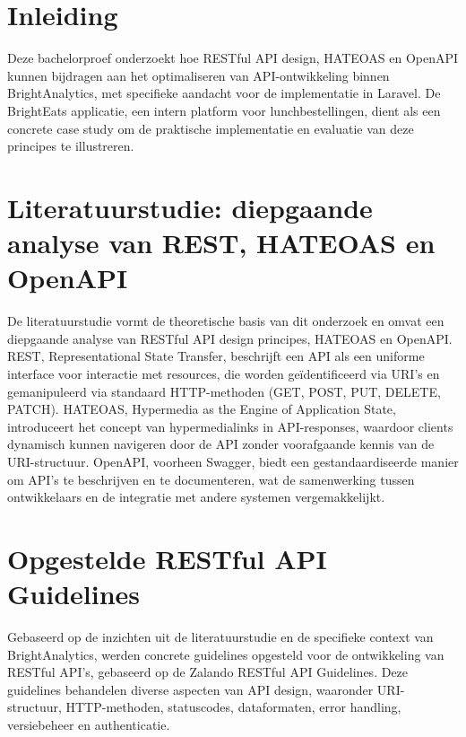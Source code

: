 \documentclass[a0,portrait]{hogent-poster}
\begin{document}
\begin{multicols}{2} %

\section{Inleiding}

Deze bachelorproef onderzoekt hoe RESTful API design, HATEOAS en OpenAPI kunnen bijdragen aan het optimaliseren van API-ontwikkeling binnen BrightAnalytics, met specifieke aandacht voor de implementatie in Laravel. De BrightEats applicatie, een intern platform voor lunchbestellingen, dient als een concrete case study om de praktische implementatie en evaluatie van deze principes te illustreren.

\section{Literatuurstudie: diepgaande analyse van REST, HATEOAS en OpenAPI}

De literatuurstudie vormt de theoretische basis van dit onderzoek en omvat een diepgaande analyse van RESTful API design principes, HATEOAS en OpenAPI. REST, Representational State Transfer, beschrijft een API als een uniforme interface voor interactie met resources, die worden geïdentificeerd via URI's en gemanipuleerd via standaard HTTP-methoden (GET, POST, PUT, DELETE, PATCH). HATEOAS, Hypermedia as the Engine of Application State, introduceert het concept van hypermedialinks in API-responses, waardoor clients dynamisch kunnen navigeren door de API zonder voorafgaande kennis van de URI-structuur. OpenAPI, voorheen Swagger, biedt een gestandaardiseerde manier om API's te beschrijven en te documenteren, wat de samenwerking tussen ontwikkelaars en de integratie met andere systemen vergemakkelijkt.

\section{Opgestelde RESTful API Guidelines}

Gebaseerd op de inzichten uit de literatuurstudie en de specifieke context van BrightAnalytics, werden concrete guidelines opgesteld voor de ontwikkeling van RESTful API's, gebaseerd op de Zalando RESTful API Guidelines. Deze guidelines behandelen diverse aspecten van API design, waaronder URI-structuur, HTTP-methoden, statuscodes, dataformaten, error handling, versiebeheer en authenticatie.


\end{multicols}
\end{document}
